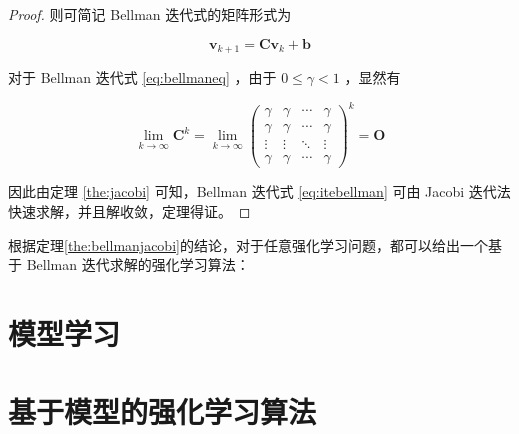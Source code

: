 \begin{proof}
则可简记 Bellman 迭代式的矩阵形式为

\begin{equation}\label{eq:bellmaneq}
    \boldsymbol{v}_{k+1} =\boldsymbol{Cv}_k+\boldsymbol{b}
\end{equation}

对于 Bellman 迭代式 \ref{eq:bellmaneq} ，由于 $0\leq\gamma<1$ ，显然有

\begin{equation}
    \lim_{k\rightarrow \infty} \boldsymbol{C}^k = \lim_{k\rightarrow \infty}\left(\begin{array}{cccc}
    \gamma & \gamma & \cdots & \gamma \\
    \gamma & \gamma & \cdots & \gamma \\
    \vdots & \vdots & \ddots & \vdots \\
    \gamma & \gamma & \cdots & \gamma
    \end{array}\right)^k = \boldsymbol{O}
\end{equation}

因此由定理 \ref{the:jacobi} 可知，Bellman 迭代式 \ref{eq:itebellman} 可由 Jacobi 迭代法快速求解，并且解收敛，定理得证。

\end{proof}

根据定理\ref{the:bellmanjacobi}的结论，对于任意强化学习问题，都可以给出一个基于 Bellman 迭代求解的强化学习算法：


\section{模型学习}

\section{基于模型的强化学习算法}

